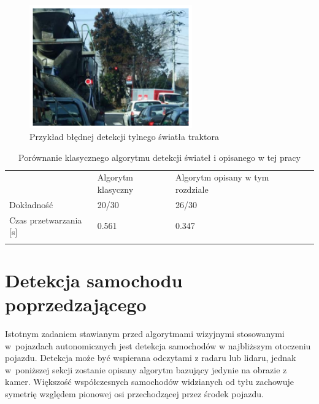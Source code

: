 \begin{figure}
  \centering
  \includegraphics[width=7cm]{img/tl_err.png}
  \caption{Przykład błędnej detekcji tylnego światła traktora\cite{T4}}
  \label{fig:tl_err}
\end{figure}

\begin{table}[]
\centering
\caption{Porównanie klasycznego algorytmu detekcji świateł i opisanego w tej pracy\cite{T4}} %
\begin{tabular}{lllll}
\cline{1-3}
\multicolumn{1}{|l|}{}                           & \multicolumn{1}{l|}{Algorytm klasyczny} & \multicolumn{1}{l|}{Algorytm opisany w tym rozdziale} &  &  \\ \cline{1-3}
\multicolumn{1}{|l|}{Dokładność}                 & \multicolumn{1}{l|}{20/30}              & \multicolumn{1}{l|}{26/30}                            &  &  \\ \cline{1-3}
\multicolumn{1}{|l|}{Czas przetwarzania {[}s{]}} & \multicolumn{1}{l|}{0.561}              & \multicolumn{1}{l|}{0.347}                            &  &  \\ \cline{1-3}
                                                 &                                         &                                                       &  & 
\end{tabular}
\label{tab:tl_results}
\end{table}




\section{Detekcja samochodu poprzedzającego}
\label{sec:car_general}

Istotnym zadaniem stawianym przed algorytmami wizyjnymi stosowanymi w~pojazdach autonomicznych jest detekcja samochodów w najbliższym otoczeniu pojazdu. 
Detekcja może być wspierana odczytami z radaru lub lidaru, jednak w~poniższej sekcji zostanie opisany algorytm bazujący jedynie na obrazie z kamer. %
Większość współczesnych samochodów widzianych od tyłu zachowuje symetrię względem pionowej osi przechodzącej przez środek pojazdu. 

